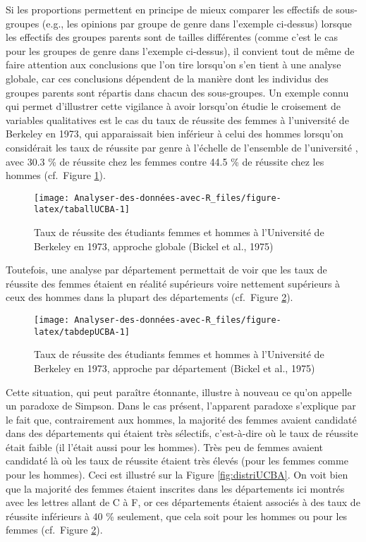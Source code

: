 \documentclass[
  french,
]{book}
\begin{document}
Si les proportions permettent en principe de mieux comparer les effectifs de sous-groupes (e.g., les opinions par groupe de genre dans l'exemple ci-dessus) lorsque les effectifs des groupes parents sont de tailles différentes (comme c'est le cas pour les groupes de genre dans l'exemple ci-dessus), il convient tout de même de faire attention aux conclusions que l'on tire lorsqu'on s'en tient à une analyse globale, car ces conclusions dépendent de la manière dont les individus des groupes parents sont répartis dans chacun des sous-groupes. Un exemple connu qui permet d'illustrer cette vigilance à avoir lorsqu'on étudie le croisement de variables qualitatives est le cas du taux de réussite des femmes à l'université de Berkeley en 1973, qui apparaissait bien inférieur à celui des hommes lorsqu'on considérait les taux de réussite par genre à l'échelle de l'ensemble de l'université \autocite{bickelSexBiasGraduate1975}, avec 30.3 \% de réussite chez les femmes contre 44.5 \% de réussite chez les hommes (cf.~Figure \ref{fig:taballUCBA}).

\begin{figure}

{\centering \texttt{[image: Analyser-des-données-avec-R\_files/figure-latex/taballUCBA-1]} 

}

\caption{Taux de réussite des étudiants femmes et hommes à l'Université de Berkeley en 1973, approche globale (Bickel et al., 1975)}\label{fig:taballUCBA}
\end{figure}

Toutefois, une analyse par département permettait de voir que les taux de réussite des femmes étaient en réalité supérieurs voire nettement supérieurs à ceux des hommes dans la plupart des départements (cf.~Figure \ref{fig:tabdepUCBA}).

\begin{figure}

{\centering \texttt{[image: Analyser-des-données-avec-R\_files/figure-latex/tabdepUCBA-1]} 

}

\caption{Taux de réussite des étudiants femmes et hommes à l'Université de Berkeley en 1973, approche par département (Bickel et al., 1975)}\label{fig:tabdepUCBA}
\end{figure}

Cette situation, qui peut paraître étonnante, illustre à nouveau ce qu'on appelle un paradoxe de Simpson. Dans le cas présent, l'apparent paradoxe s'explique par le fait que, contrairement aux hommes, la majorité des femmes avaient candidaté dans des départements qui étaient très sélectifs, c'est-à-dire où le taux de réussite était faible (il l'était aussi pour les hommes). Très peu de femmes avaient candidaté là où les taux de réussite étaient très élevés (pour les femmes comme pour les hommes). Ceci est illustré sur la Figure \ref{fig:distriUCBA}. On voit bien que la majorité des femmes étaient inscrites dans les départements ici montrés avec les lettres allant de C à F, or ces départements étaient associés à des taux de réussite inférieurs à 40 \% seulement, que cela soit pour les hommes ou pour les femmes (cf.~Figure \ref{fig:tabdepUCBA}).
\end{document}
